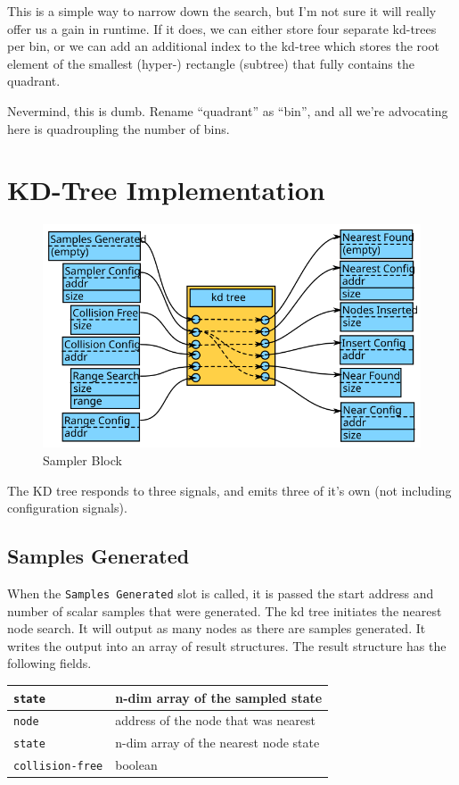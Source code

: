 This is a simple way to narrow down the search, but I'm not sure it will really offer us a gain in runtime. If it does, we can either store four separate kd-trees per bin, or we can add an additional index to the kd-tree which stores the root element of the smallest (hyper-) rectangle (subtree) that fully contains the quadrant.

Nevermind, this is dumb. Rename ``quadrant'' as ``bin'', and all we're advocating here is quadroupling the number of bins.

\section{KD-Tree Implementation}

\begin{figure}[H]
\begin{centering}
    \includegraphics[scale=1]{fig/blocks/kdtree}
    \caption{Sampler Block}
\end{centering}
\end{figure}


The KD tree responds to three signals, and emits three of it's own (not including configuration signals).

\subsection{Samples Generated}
 When the \texttt{Samples Generated} slot is called, it is passed the start address and number of scalar samples that were generated. The kd tree initiates the nearest node search. It will output as many nodes as there are samples generated. It writes the output into an array of result structures. The result structure has the following fields. 

\begin{table}
    \begin{tabular}{|l|l|}
        \hline
        \texttt{state} & n-dim array of the sampled state \\ \hline
        \texttt{node}  & address of the node that was nearest \\ \hline
        \texttt{state} & n-dim array of the nearest node state \\ \hline
        \texttt{collision-free} & boolean \\ \hline
    \end{tabular}
\end{table}


